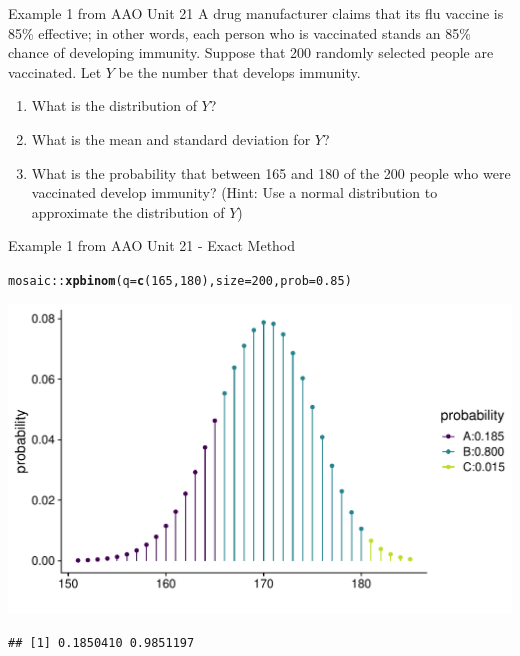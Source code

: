 \documentclass[10pt]{beamer}\usepackage[]{graphicx}\usepackage[]{color}
\makeatletter
\def\maxwidth{ %
  \ifdim\Gin@nat@width>\linewidth
    \linewidth
  \else
    \Gin@nat@width
  \fi
}
\newcommand{\hlnum}[1]{\textcolor[rgb]{0.686,0.059,0.569}{#1}}%
\newcommand{\hlopt}[1]{\textcolor[rgb]{0,0,0}{#1}}%
\newcommand{\hlstd}[1]{\textcolor[rgb]{0.345,0.345,0.345}{#1}}%
\newcommand{\hlkwc}[1]{\textcolor[rgb]{0.333,0.667,0.333}{#1}}%
\newcommand{\hlkwd}[1]{\textcolor[rgb]{0.737,0.353,0.396}{\textbf{#1}}}%
\newenvironment{kframe}{%
 \def\at@end@of@kframe{}%
 \ifinner\ifhmode%
  \def\at@end@of@kframe{\end{minipage}}%
  \begin{minipage}{\columnwidth}%
 \fi\fi%
 \def\FrameCommand##1{\hskip\@totalleftmargin \hskip-\fboxsep
 \colorbox{shadecolor}{##1}\hskip-\fboxsep
     \hskip-\linewidth \hskip-\@totalleftmargin \hskip\columnwidth}%
 \MakeFramed {\advance\hsize-\width
   \@totalleftmargin\z@ \linewidth\hsize
   \@setminipage}}%
 {\par\unskip\endMakeFramed%
 \at@end@of@kframe}
\newenvironment{knitrout}{}{} %
\makeatother
\begin{document}
\begin{frame}{Example 1 from AAO Unit 21}
	A drug manufacturer claims that its flu vaccine is 85\% effective; in other words, each person who is vaccinated stands an 85\% chance of developing immunity. Suppose that 200 randomly selected people are vaccinated. Let $Y$ be the number that develops immunity.
	
	\begin{enumerate}
		\item What is the distribution of $Y$?
		\item What is the mean and standard deviation for $Y$?
		\item What is the probability that between 165 and 180 of the 200 people who were vaccinated
		develop immunity? (Hint: Use a normal distribution to approximate the distribution of $Y$)
	\end{enumerate}
\end{frame}


\begin{frame}[fragile]{Example 1 from AAO Unit 21 - Exact Method}
	
\begin{knitrout}\tiny
{}\color{fgcolor}\begin{kframe}
\begin{alltt}
\hlstd{mosaic}\hlopt{::}\hlkwd{xpbinom}\hlstd{(}\hlkwc{q} \hlstd{=} \hlkwd{c}\hlstd{(}\hlnum{165}\hlstd{,} \hlnum{180}\hlstd{),} \hlkwc{size} \hlstd{=} \hlnum{200}\hlstd{,} \hlkwc{prob} \hlstd{=} \hlnum{0.85}\hlstd{)}
\end{alltt}
\end{kframe}

{\centering \includegraphics[width=\maxwidth]{figure/unnamed-chunk-8-1} 

}


\begin{kframe}\begin{verbatim}
## [1] 0.1850410 0.9851197
\end{verbatim}
\end{kframe}
\end{knitrout}
\end{frame}
\end{document}
